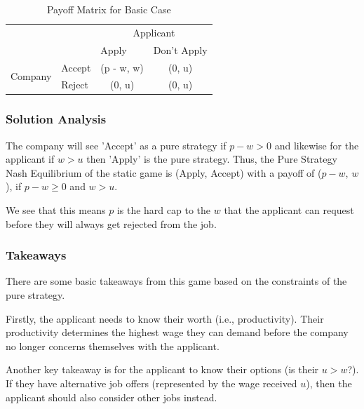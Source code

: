 \documentclass[a4paper, 12pt]{article}
\begin{document}
\begin{table}[H]
\begin{center}
\begin{tabular}{clcc}
                                               & \multicolumn{1}{c}{}        & \multicolumn{2}{c}{Applicant}                                 \\ \cline{3-4} 
                                               & \multicolumn{1}{l|}{}       & \multicolumn{1}{l|}{Apply}     & \multicolumn{1}{l|}{Don't Apply} \\ \cline{2-4} 
\multicolumn{1}{c|}{\multirow{2}{*}{Company}} & \multicolumn{1}{l|}{Accept} & \multicolumn{1}{c|}{(p - w, w)} & \multicolumn{1}{c|}{(0, u)} \\ \cline{2-4} 
\multicolumn{1}{c|}{}                          & \multicolumn{1}{l|}{Reject} & \multicolumn{1}{c|}{(0, u)}     & \multicolumn{1}{c|}{(0, u)} \\ \cline{2-4} 
\end{tabular}
\end{center}
\caption{Payoff Matrix for Basic Case}
\label{tab:basiccase}
\end{table}



\subsubsection{Solution Analysis}

The company will see 'Accept' as a pure strategy if $p-w > 0$ and likewise for the applicant if $w > u$ then 'Apply' is the pure strategy. Thus, the Pure Strategy Nash Equilibrium of the static game is (Apply, Accept) with a payoff of ($p-w$, $w$), if $p-w \geq 0$ and $w > u$.

We see that this means $p$ is the hard cap to the $w$ that the applicant can request before they will always get rejected from the job.

\subsubsection{Takeaways}
There are some basic takeaways from this game based on the constraints of the pure strategy.

Firstly, the applicant needs to know their worth (i.e., productivity). Their productivity determines the highest wage they can demand before the company no longer concerns themselves with the applicant.

Another key takeaway is for the applicant to know their options (is their $u > w$?). If they have alternative job offers (represented by the wage received $u$), then the applicant should also consider other jobs instead.
\end{document}
